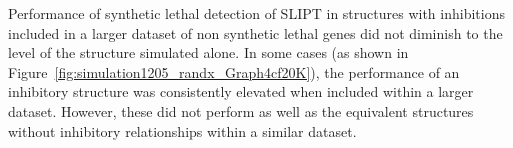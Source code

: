 


Performance of \gls{synthetic lethal} detection of \gls{SLIPT} in  structures with inhibitions included in a larger dataset of non synthetic lethal genes did not diminish to the level of the  structure simulated alone. In some cases (as shown in Figure~\ref{fig:simulation1205_randx_Graph4cf20K}), the performance of an inhibitory  structure was consistently elevated when included within a larger dataset. However, these did not perform as well as the equivalent  structures without inhibitory relationships within a similar dataset.


